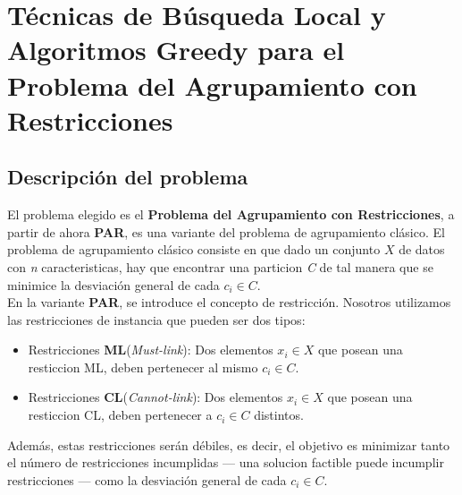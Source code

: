 \chapter{Técnicas de Búsqueda Local y Algoritmos Greedy para el Problema del Agrupamiento con Restricciones}

\section{Descripción del problema}
El problema elegido es el \textbf{Problema del Agrupamiento con Restricciones}, a partir de ahora \textbf{PAR}, es una variante del problema de agrupamiento clásico.
El problema de agrupamiento clásico consiste en que dado un conjunto $ X $ de datos con \emph{n} caracteristicas, hay que encontrar una particion \emph{C} de tal manera que se minimice la desviación general de cada $ c_{i} \in C $.\\
En la variante \textbf{PAR}, se introduce el concepto de restricción. Nosotros utilizamos las restricciones de instancia que pueden ser dos tipos:
\begin{itemize}
   \item Restricciones \textbf{ML}(\emph{Must-link}): Dos elementos $ x_{i} \in X $ que posean una resticcion ML, deben pertenecer al mismo $ c_{i} \in C $.
   \item Restricciones \textbf{CL}(\emph{Cannot-link}): Dos elementos $ x_{i} \in X $ que posean una resticcion CL, deben pertenecer a $ c_{i} \in C $ distintos.
\end{itemize}
Además, estas restricciones serán débiles, es decir, el objetivo es minimizar tanto el número de restricciones incumplidas --- una solucion factible puede incumplir restricciones --- como la desviación general de cada $ c_{i} \in C $.

